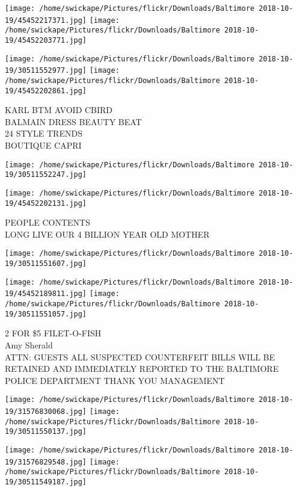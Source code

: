 \documentclass[10pt,letterpaper]{article}
\begin{document}
\texttt{[image: /home/swickape/Pictures/flickr/Downloads/Baltimore 2018-10-19/45452217371.jpg]}
\texttt{[image: /home/swickape/Pictures/flickr/Downloads/Baltimore 2018-10-19/45452203771.jpg]}

\texttt{[image: /home/swickape/Pictures/flickr/Downloads/Baltimore 2018-10-19/30511552977.jpg]}
\texttt{[image: /home/swickape/Pictures/flickr/Downloads/Baltimore 2018-10-19/45452202861.jpg]}

KARL BTM AVOID CBIRD\\
BALMAIN DRESS BEAUTY BEAT\\
24 STYLE TRENDS\\
BOUTIQUE CAPRI\\
\pagebreak

\texttt{[image: /home/swickape/Pictures/flickr/Downloads/Baltimore 2018-10-19/30511552247.jpg]}

\vspace{0.25in}
\texttt{[image: /home/swickape/Pictures/flickr/Downloads/Baltimore 2018-10-19/45452202131.jpg]}

PEOPLE CONTENTS\\
LONG LIVE OUR 4 BILLION YEAR OLD MOTHER\\
\pagebreak

\texttt{[image: /home/swickape/Pictures/flickr/Downloads/Baltimore 2018-10-19/30511551607.jpg]}

\vspace{0.25in}
\texttt{[image: /home/swickape/Pictures/flickr/Downloads/Baltimore 2018-10-19/45452189811.jpg]}
\texttt{[image: /home/swickape/Pictures/flickr/Downloads/Baltimore 2018-10-19/30511551057.jpg]}

2 FOR \$5 FILET{-}O{-}FISH\\
Amy Sherald\\
ATTN: GUESTS ALL SUSPECTED COUNTERFEIT BILLS WILL BE RETAINED AND IMMEDIATELY REPORTED TO THE BALTIMORE POLICE DEPARTMENT THANK YOU MANAGEMENT\\
\pagebreak

\texttt{[image: /home/swickape/Pictures/flickr/Downloads/Baltimore 2018-10-19/31576830068.jpg]}
\texttt{[image: /home/swickape/Pictures/flickr/Downloads/Baltimore 2018-10-19/30511550137.jpg]}

\texttt{[image: /home/swickape/Pictures/flickr/Downloads/Baltimore 2018-10-19/31576829548.jpg]}
\texttt{[image: /home/swickape/Pictures/flickr/Downloads/Baltimore 2018-10-19/30511549187.jpg]}
\end{document}

